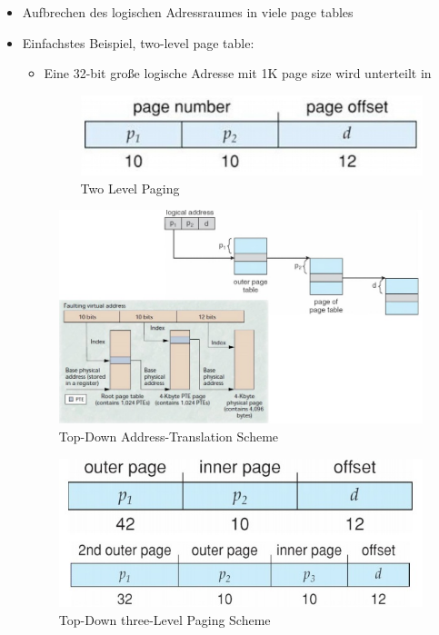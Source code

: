 \documentclass[a4paper]{scrreprt}
\begin{document}
\begin{itemize}
\item Aufbrechen des logischen Adressraumes in viele page tables
\item Einfachstes Beispiel, two-level page table:
\begin{itemize}
\item Eine 32-bit große logische Adresse mit 1K page size wird unterteilt in
\begin{figure}[ht]
\centering
\includegraphics[scale=0.3]{twolevelpage.png}
\caption{Two Level Paging}
\end{figure}

\end{itemize}

\begin{figure}[ht]
\centering
\includegraphics[scale=0.4]{topdownadress.png}
\caption{Top-Down Address-Translation Scheme}
\end{figure}

\begin{figure}[ht]
\centering
\includegraphics[scale=0.3]{topdownthreelevel.png}
\caption{Top-Down three-Level Paging Scheme}
\end{figure}

\end{itemize}
\end{document}
